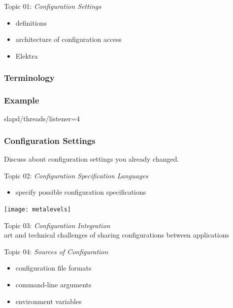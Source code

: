 \begin{frame}
	Topic 01: \textit{Configuration Settings}
	\begin{itemize}
		\item definitions
		\item architecture of configuration access
		\item Elektra
	\end{itemize}
\end{frame}

\begin{frame}
	\frametitle{Terminology}
	
\end{frame}

\begin{frame}[fragile]
	\frametitle{Example}

	\begin{code}[language=CfgElektra]
	slapd/threads/listener=4
	\end{code}
\end{frame}

\begin{assignment}
	\frametitle{Configuration Settings}
	\begin{task}
	Discuss about configuration settings you already changed.
	\end{task}
\end{assignment}

\begin{frame}
	Topic 02: \textit{Configuration Specification Languages}
	\begin{itemize}
		\item specify possible configuration specifications
	\end{itemize}
	\vspace{0.5cm}
	\texttt{[image: metalevels]}
\end{frame}

\begin{frame}
	Topic 03: \textit{Configuration Integration}
	\\ \vspace{1cm}
	art and technical challenges of sharing configurations between applications
\end{frame}


\begin{frame}
	Topic 04: \textit{Sources of Configuration}
	\begin{itemize}
		\item configuration file formats
		\item command-line arguments
		\item environment variables
	\end{itemize}
\end{frame}

